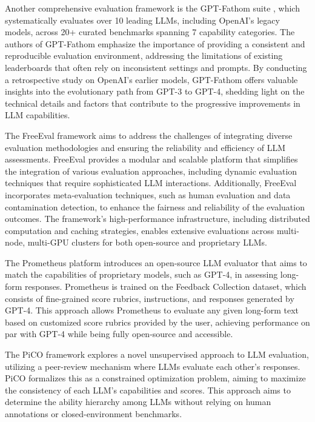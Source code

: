 \documentclass[11pt]{article}
\begin{document}
Another comprehensive evaluation framework is the GPT-Fathom suite \cite{ref83}, which systematically evaluates over 10 leading LLMs, including OpenAI's legacy models, across 20+ curated benchmarks spanning 7 capability categories. The authors of GPT-Fathom emphasize the importance of providing a consistent and reproducible evaluation environment, addressing the limitations of existing leaderboards that often rely on inconsistent settings and prompts. By conducting a retrospective study on OpenAI's earlier models, GPT-Fathom offers valuable insights into the evolutionary path from GPT-3 to GPT-4, shedding light on the technical details and factors that contribute to the progressive improvements in LLM capabilities.

The FreeEval framework \cite{ref76} aims to address the challenges of integrating diverse evaluation methodologies and ensuring the reliability and efficiency of LLM assessments. FreeEval provides a modular and scalable platform that simplifies the integration of various evaluation approaches, including dynamic evaluation techniques that require sophisticated LLM interactions. Additionally, FreeEval incorporates meta-evaluation techniques, such as human evaluation and data contamination detection, to enhance the fairness and reliability of the evaluation outcomes. The framework's high-performance infrastructure, including distributed computation and caching strategies, enables extensive evaluations across multi-node, multi-GPU clusters for both open-source and proprietary LLMs.

The Prometheus platform \cite{ref306} introduces an open-source LLM evaluator that aims to match the capabilities of proprietary models, such as GPT-4, in assessing long-form responses. Prometheus is trained on the Feedback Collection dataset, which consists of fine-grained score rubrics, instructions, and responses generated by GPT-4. This approach allows Prometheus to evaluate any given long-form text based on customized score rubrics provided by the user, achieving performance on par with GPT-4 while being fully open-source and accessible.

The PiCO framework \cite{ref84} explores a novel unsupervised approach to LLM evaluation, utilizing a peer-review mechanism where LLMs evaluate each other's responses. PiCO formalizes this as a constrained optimization problem, aiming to maximize the consistency of each LLM's capabilities and scores. This approach aims to determine the ability hierarchy among LLMs without relying on human annotations or closed-environment benchmarks.
\end{document}
